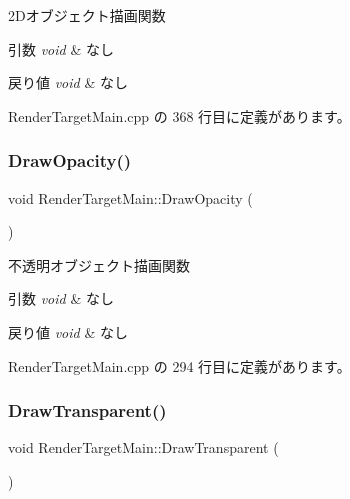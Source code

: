 2\+Dオブジェクト描画関数 


\begin{DoxyParams}{引数}
{\em void} & なし \\
\hline
\end{DoxyParams}

\begin{DoxyRetVals}{戻り値}
{\em void} & なし \\
\hline
\end{DoxyRetVals}


 Render\+Target\+Main.\+cpp の 368 行目に定義があります。

\mbox{\label{class_render_target_main_a71adae5f98266115b999d813e44bc393}} 
\subsubsection{\texorpdfstring{Draw\+Opacity()}{DrawOpacity()}}
{\footnotesize\ttfamily void Render\+Target\+Main\+::\+Draw\+Opacity (\begin{DoxyParamCaption}{ }\end{DoxyParamCaption})\hspace{0.3cm}{\ttfamily [private]}}



不透明オブジェクト描画関数 


\begin{DoxyParams}{引数}
{\em void} & なし \\
\hline
\end{DoxyParams}

\begin{DoxyRetVals}{戻り値}
{\em void} & なし \\
\hline
\end{DoxyRetVals}


 Render\+Target\+Main.\+cpp の 294 行目に定義があります。

\mbox{\label{class_render_target_main_ac6f40e96264e3466e30b86d5e96cf62c}} 
\subsubsection{\texorpdfstring{Draw\+Transparent()}{DrawTransparent()}}
{\footnotesize\ttfamily void Render\+Target\+Main\+::\+Draw\+Transparent (\begin{DoxyParamCaption}{ }\end{DoxyParamCaption})\hspace{0.3cm}{\ttfamily [private]}}



